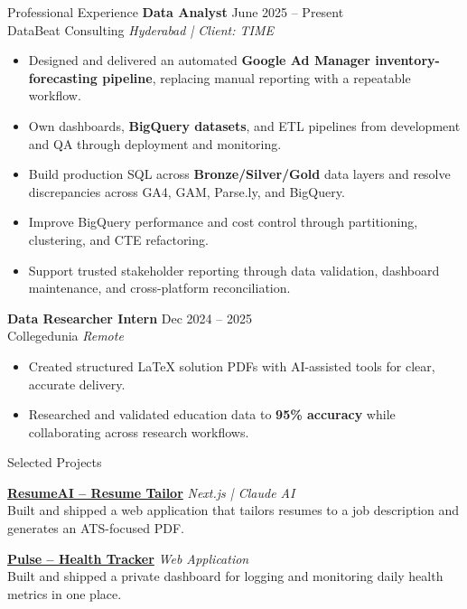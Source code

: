 \documentclass{resume}
\begin{document}
\begin{rSection}{Professional Experience}
\textbf{Data Analyst} \hfill June 2025 -- Present \\
DataBeat Consulting \hfill \textit{Hyderabad | Client: TIME}
\begin{itemize}
  \itemsep -3pt
  \item Designed and delivered an automated \textbf{Google Ad Manager inventory-forecasting pipeline}, replacing manual reporting with a repeatable workflow.
  \item Own dashboards, \textbf{BigQuery datasets}, and ETL pipelines from development and QA through deployment and monitoring.
  \item Build production SQL across \textbf{Bronze/Silver/Gold} data layers and resolve discrepancies across GA4, GAM, Parse.ly, and BigQuery.
  \item Improve BigQuery performance and cost control through partitioning, clustering, and CTE refactoring.
  \item Support trusted stakeholder reporting through data validation, dashboard maintenance, and cross-platform reconciliation.
\end{itemize}

\textbf{Data Researcher Intern} \hfill Dec 2024 -- 2025 \\
Collegedunia \hfill \textit{Remote}
\begin{itemize}
  \itemsep -3pt
  \item Created structured LaTeX solution PDFs with AI-assisted tools for clear, accurate delivery.
  \item Researched and validated education data to \textbf{95\% accuracy} while collaborating across research workflows.
\end{itemize}
\end{rSection}

\vspace{-5pt}

\begin{rSection}{Selected Projects}
\item \href{https://resume-tailor.vercel.app/}{\textbf{ResumeAI -- Resume Tailor}} \hfill \textit{Next.js | Claude AI} \\
Built and shipped a web application that tailors resumes to a job description and generates an ATS-focused PDF.

\item \href{https://pulse-v24w.onrender.com}{\textbf{Pulse -- Health Tracker}} \hfill \textit{Web Application} \\
Built and shipped a private dashboard for logging and monitoring daily health metrics in one place.
\end{rSection}
\end{document}
